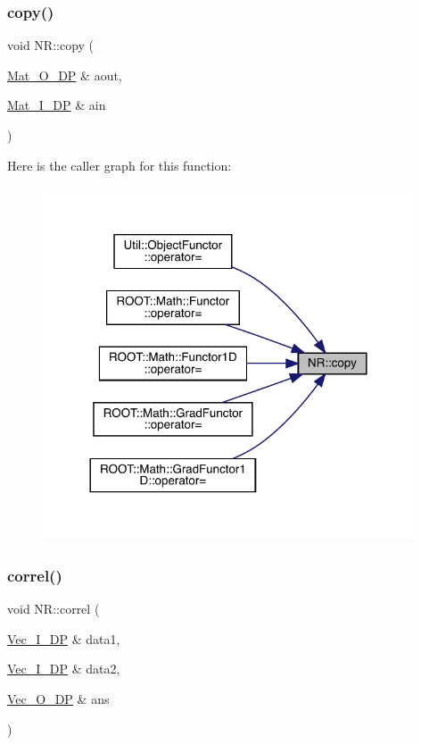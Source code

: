 \mbox{\label{namespaceNR_a33f0ee887bd75c78a6b2f97a825f5be1}} 
\subsubsection{\texorpdfstring{copy()}{copy()}}
{\footnotesize\ttfamily void N\+R\+::copy (\begin{DoxyParamCaption}\item[{\mbox{\hyperlink{namespaceNR_adc1f8da33094b6bbeb1f5f899515ce54}{Mat\+\_\+\+O\+\_\+\+DP}} \&}]{aout,  }\item[{\mbox{\hyperlink{namespaceNR_a2b8abfda8fffad6ba0a1b5a4c0773dbf}{Mat\+\_\+\+I\+\_\+\+DP}} \&}]{ain }\end{DoxyParamCaption})}

Here is the caller graph for this function\+:
\nopagebreak
\begin{figure}[H]
\begin{center}
\leavevmode
\includegraphics[width=312pt]{da/d46/namespaceNR_a33f0ee887bd75c78a6b2f97a825f5be1_icgraph}
\end{center}
\end{figure}
\mbox{\label{namespaceNR_a38e1298c084b073e4e7465dbd62ad7fb}} 
\subsubsection{\texorpdfstring{correl()}{correl()}}
{\footnotesize\ttfamily void N\+R\+::correl (\begin{DoxyParamCaption}\item[{\mbox{\hyperlink{namespaceNR_a9f943da53862537c552e2a770cb170ae}{Vec\+\_\+\+I\+\_\+\+DP}} \&}]{data1,  }\item[{\mbox{\hyperlink{namespaceNR_a9f943da53862537c552e2a770cb170ae}{Vec\+\_\+\+I\+\_\+\+DP}} \&}]{data2,  }\item[{\mbox{\hyperlink{namespaceNR_a970094d23441f8ef6a45282a7eb2103d}{Vec\+\_\+\+O\+\_\+\+DP}} \&}]{ans }\end{DoxyParamCaption})}

